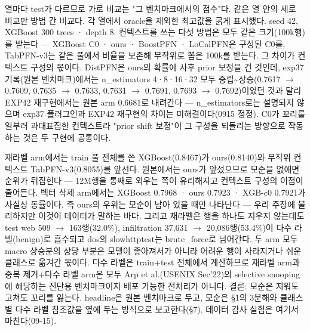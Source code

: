 열마다 test가 다르므로 가로 비교는 "그 벤치마크에서의 점수"다. 같은 열 안의 세로 비교만 방법 간 비교다. 각 열에서 oracle을 제외한 최고값을 굵게 표시했다. seed 42, XGBoost 300 trees · depth 8. 컨텍스트를 쓰는 다섯 방법은 모두 같은 크기(100k행)를 받는다 — XGBoost C0 · ours · BoostPFN · LoCalPFN은 구성된 C0를, TabPFN-v3는 같은 풀에서 비율을 보존해 무작위로 뽑은 100k를 받는다. 그 차이가 컨텍스트 구성의 몫이다. DistPFN은 ours의 확률에 사후 prior 보정을 건 것인데, exp37 기록(원본 벤치마크)에서는 n\_\allowbreak{}estimators 4·8·16·32 모두 중립\textasciitilde{}상승(0.7617 \ensuremath{\rightarrow} 0.7609, 0.7635 \ensuremath{\rightarrow} 0.7633, 0.7631 \ensuremath{\rightarrow} 0.7691, 0.7693 \ensuremath{\rightarrow} 0.7692)이었던 것과 달리 EXP42 재구현에서는 원본 arm 0.6681로 내려간다 — n\_\allowbreak{}estimators로는 설명되지 않으며 exp37 플러그인과 EXP42 재구현의 차이는 미해결이다(0915 정정). C0가 꼬리를 일부러 과대표집한 컨텍스트라 "prior shift 보정"이 그 구성을 되돌리는 방향으로 작동하는 것은 두 구현에 공통이다.

재라벨 arm에서는 train 풀 전체를 쓴 XGBoost(0.8467)가 ours(0.8140)와 무작위 컨텍스트 TabPFN-v3(0.8055)를 앞선다. 원본에서는 ours가 앞섰으므로 모순을 없애면 순위가 뒤집힌다 — 12M행을 통째로 외우는 쪽이 유리해지고 컨텍스트 구성의 이점이 줄어든다. 벡터 삭제 arm에서는 XGBoost 0.7968 · ours 0.7923 · XGB-c0 0.7921가 사실상 동률이다. 즉 ours의 우위는 모순이 남아 있을 때만 나타난다 — 우리 주장에 불리하지만 이것이 데이터가 말하는 바다. 그리고 재라벨은 행을 하나도 지우지 않는데도 test web 509 \ensuremath{\rightarrow} 163행(32.0\%), infiltration 37,631 \ensuremath{\rightarrow} 20,086행(53.4\%)이 다수 라벨(benign)로 흡수되고 dos의 slowhttptest는 brute\_\allowbreak{}force로 넘어간다. 두 arm 모두 macro 상승분의 상당 부분은 모델이 좋아져서가 아니라 어려운 행이 사라지거나 쉬운 클래스로 옮겨간 몫이다. 다수 라벨은 train+\allowbreak{}test 전체에서 계산하므로 재라벨 arm과 중복 제거+\allowbreak{}다수 라벨 arm은 모두 Arp et al.(USENIX Sec'22)의 selective snooping에 해당하는 진단용 벤치마크이지 배포 가능한 전처리가 아니다. 결론: 모순은 지워도 고쳐도 꼬리를 잃는다. headline은 원본 벤치마크로 두고, 모순은 §1의 3분해와 클래스별 다수 라벨 참조값을 옆에 두는 방식으로 보고한다(§7). 데이터 감사 실험은 여기서 마친다(09-15).

